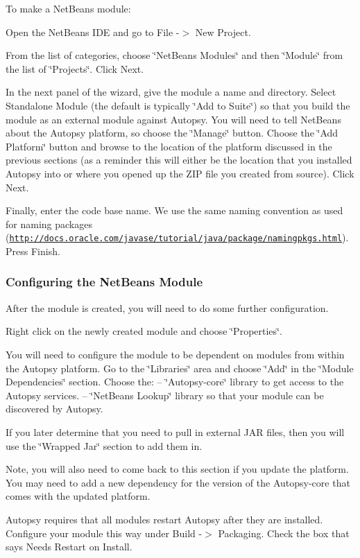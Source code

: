 To make a Net\+Beans module\+:
\begin{DoxyItemize}
\item Open the Net\+Beans I\+DE and go to File -\/$>$ New Project.
\item From the list of categories, choose \char`\"{}\+Net\+Beans Modules\char`\"{} and then \char`\"{}\+Module\char`\"{} from the list of \char`\"{}\+Projects\char`\"{}. Click Next.
\item In the next panel of the wizard, give the module a name and directory. Select Standalone Module (the default is typically \char`\"{}\+Add to Suite\char`\"{}) so that you build the module as an external module against Autopsy. You will need to tell Net\+Beans about the Autopsy platform, so choose the \char`\"{}\+Manage\char`\"{} button. Choose the \char`\"{}\+Add Platform\char`\"{} button and browse to the location of the platform discussed in the previous sections (as a reminder this will either be the location that you installed Autopsy into or where you opened up the Z\+IP file you created from source). Click Next.
\item Finally, enter the code base name. We use the same naming convention as used for naming packages (\href{http://docs.oracle.com/javase/tutorial/java/package/namingpkgs.html}{\tt http\+://docs.\+oracle.\+com/javase/tutorial/java/package/namingpkgs.\+html}). Press Finish.
\end{DoxyItemize}\hypertarget{mod_dev_page_mod_dev_mod_nb_config}{}\subsubsection{Configuring the Net\+Beans Module}\label{mod_dev_page_mod_dev_mod_nb_config}
After the module is created, you will need to do some further configuration.
\begin{DoxyItemize}
\item Right click on the newly created module and choose \char`\"{}\+Properties\char`\"{}.
\item You will need to configure the module to be dependent on modules from within the Autopsy platform. Go to the \char`\"{}\+Libraries\char`\"{} area and choose \char`\"{}\+Add\char`\"{} in the \char`\"{}\+Module Dependencies\char`\"{} section. Choose the\+: -- \char`\"{}\+Autopsy-\/core\char`\"{} library to get access to the Autopsy services. -- \char`\"{}\+Net\+Beans Lookup\char`\"{} library so that your module can be discovered by Autopsy.
\item If you later determine that you need to pull in external J\+AR files, then you will use the \char`\"{}\+Wrapped Jar\char`\"{} section to add them in.
\item Note, you will also need to come back to this section if you update the platform. You may need to add a new dependency for the version of the Autopsy-\/core that comes with the updated platform.
\item Autopsy requires that all modules restart Autopsy after they are installed. Configure your module this way under Build -\/$>$ Packaging. Check the box that says Needs Restart on Install.
\end{DoxyItemize}

